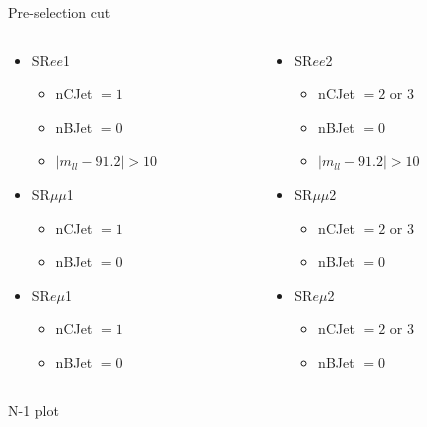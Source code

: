 \documentclass[mathserif,serif]{beamer}
\begin{document}
\begin{frame}{Pre-selection cut}
\normalsize
\begin{columns}
\begin{column}{0.5\textwidth}

\begin{itemize}
\item SR$ee$1
\begin{itemize}
\item nCJet $=1$
\item nBJet $=0$
\item $|m_{ll} - 91.2| > 10$
\end{itemize}
\item SR$\mu\mu$1
\begin{itemize}
\item nCJet $=1$
\item nBJet $=0$
\end{itemize}
\item SR$e\mu$1
\begin{itemize}
\item nCJet $=1$
\item nBJet $=0$
\end{itemize}
\end{itemize}

\end{column}
\begin{column}{0.5\textwidth}

\begin{itemize}
\item SR$ee$2
\begin{itemize}
\item nCJet $=2$ or $3$
\item nBJet $=0$
\item $|m_{ll} - 91.2| > 10$
\end{itemize}
\item SR$\mu\mu$2
\begin{itemize}
\item nCJet $=2$ or $3$
\item nBJet $=0$
\end{itemize}
\item SR$e\mu$2
\begin{itemize}
\item nCJet $=2$ or $3$
\item nBJet $=0$
\end{itemize}
\end{itemize}

\end{column}
\end{columns}
\end{frame}




\begin{frame}
\begin{center}
\huge
N-1 plot
\end{center}
\end{frame}



\end{document}
